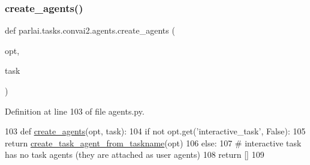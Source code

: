 \subsubsection{\texorpdfstring{create\+\_\+agents()}{create\_agents()}}
{\footnotesize\ttfamily def parlai.\+tasks.\+convai2.\+agents.\+create\+\_\+agents (\begin{DoxyParamCaption}\item[{}]{opt,  }\item[{}]{task }\end{DoxyParamCaption})}



Definition at line 103 of file agents.\+py.


\begin{DoxyCode}
103 \textcolor{keyword}{def }\hyperlink{namespaceparlai_1_1tasks_1_1wizard__of__wikipedia_1_1agents_a89bd55d60a50f2604b1eb59ab0e064bc}{create\_agents}(opt, task):
104     \textcolor{keywordflow}{if} \textcolor{keywordflow}{not} opt.get(\textcolor{stringliteral}{'interactive\_task'}, \textcolor{keyword}{False}):
105         \textcolor{keywordflow}{return} \hyperlink{namespaceparlai_1_1core_1_1agents_ab4473fa54af02b5ab385b41b51dacd10}{create\_task\_agent\_from\_taskname}(opt)
106     \textcolor{keywordflow}{else}:
107         \textcolor{comment}{# interactive task has no task agents (they are attached as user agents)}
108         \textcolor{keywordflow}{return} []
109 \end{DoxyCode}
